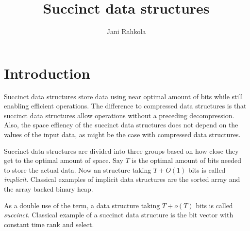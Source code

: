 \documentclass[11pt]{article}
\title{Succinct data structures}
\author{Jani Rahkola}
\newcommand{\bigo}{O}
\newcommand{\smallo}{o}
\begin{document}
\maketitle

\section{Introduction}

Succinct data structures store data using near optimal amount of bits
while still enabling efficient operations. The difference to
compressed data structures is that succinct data structures allow
operations without a preceding decompression. Also, the space effiency
of the succinct data structures does not depend on the values of the
input data, as might be the case with compressed data structures.

Succinct data structures are divided into three groups based on how
close they get to the optimal amount of space. Say $T$ is the optimal
amount of bits needed to store the actual data. Now an structure
taking $T + \bigo(1)$ bits is called \emph{implicit}. Classical
examples of implicit data structures are the sorted array and the
array backed binary heap.

As a double use of the term, a data structure taking $T + \smallo(T)$
bits is called \emph{succinct}. Classical example of a succinct data
structure is the bit vector with constant time rank and select.
\end{document}
